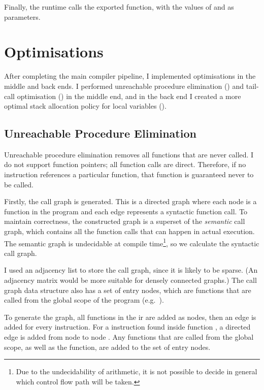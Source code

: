 \documentclass[00-main.tex]{subfiles}
\begin{document}
Finally, the runtime calls the exported  function, with the values of  and  as parameters.

\section{Optimisations}\label{sec:impl:optimisations}

After completing the main compiler pipeline, I implemented optimisations in the middle and back ends.
I performed unreachable procedure elimination () and tail-call optimisation () in the middle end, and in the back end I created a more optimal stack allocation policy for local variables ().

\subsection{Unreachable Procedure Elimination}\label{sec:impl:unreachable procedure elimination}

Unreachable procedure elimination removes all functions that are never called.
I do not support function pointers; all function calls are direct.
Therefore, if no  instruction references a particular function, that function is guaranteed never to be called.

Firstly, the call graph is generated.
This is a directed graph where each node is a function in the program and each edge represents a syntactic function call.
To maintain correctness, the constructed graph is a superset of the \emph{semantic} call graph, which contains all the function calls that can happen in actual execution.
The semantic graph is undecidable at compile time\footnote{Due to the undecidability of arithmetic, it is not possible to decide in general which control flow path will be taken.}, so we calculate the syntactic call graph.

I used an adjacency list to store the call graph, since it is likely to be sparse.
(An adjacency matrix would be more suitable for densely connected graphs.)
The call graph data structure also has a set of entry nodes, which are functions that are called from the global scope of the program (e.g.~). %

To generate the graph, all functions in the \gls{ir} are added as nodes, then an edge is added for every  instruction.
For a  instruction found inside function , a directed edge is added from node  to node .
Any functions that are called from the global scope, as well as the  function, are added to the set of entry nodes.
\end{document}
